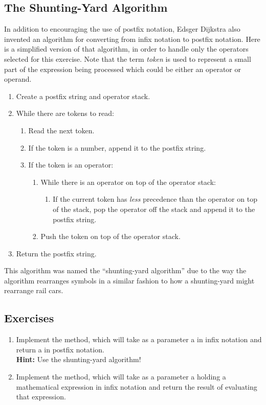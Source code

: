 		\subsection{The Shunting-Yard Algorithm}
			In addition to encouraging the use of postfix notation, Edsger Dijkstra also invented an algorithm for converting from infix notation to postfix notation. Here is a simplified version of that algorithm, in order to handle only the operators selected for this exercise. Note that the term \emph{token} is used to represent a small part of the expression being processed which could be either an operator or operand.
			\begin{enumerate}
				\item Create a postfix string and operator stack.
				\item While there are tokens to read:
				\begin{enumerate}
					\item Read the next token.
					\item If the token is a number, append it to the postfix string.
					\item If the token is an operator:
					\begin{enumerate}
						\item While there is an operator on top of the operator stack:
							\begin{enumerate}
								\item If the current token has \emph{less} precedence than the operator on top of the stack, pop the operator off the stack and append it to the postfix string.
							\end{enumerate}
						\item Push the token on top of the operator stack.
					\end{enumerate}
				\end{enumerate}
				\item Return the postfix string.
			\end{enumerate}
			This algorithm was named the ``shunting-yard algorithm'' due to the way the algorithm rearranges symbols in a similar fashion to how a shunting-yard might rearrange rail cars.
		\subsection{Exercises}
			\begin{enumerate}
				\item Implement the  method, which will take as a parameter a  in infix notation and return a  in postfix notation.\\
				{\small\textbf{Hint:} Use the shunting-yard algorithm!}
				\item Implement the  method, which will take as a parameter a  holding a mathematical expression in infix notation and return the result of evaluating that expression.
			\end{enumerate}
